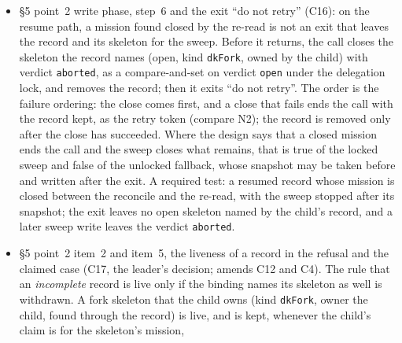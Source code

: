 \documentclass[a4paper,10pt,fleqn]{article}
\newcommand{\fpath}[1]{\texttt{#1}}
\newcommand{\field}[1]{\texttt{#1}}
\begin{document}
\begin{itemize}
    closed it). The sentences ``removed as the last step of a successful
    write'' and ``the record is then overwritten or removed'' change
    accordingly; the dispatch path of \fpath{pretooluse\_dispatch.go} is not
    changed. Reconcile must distinguish the two lives of a record: a
    complete record is never resumed and is live when the child's claim is
    for the skeleton's mission, whatever the binding names; an incomplete one
    keeps the rule of C4 (withdrawn by C17: with \field{fixClaimLive} an
    incomplete record is live on the same test as a complete one, the claim
    for the skeleton's mission, and the item on C17 below replaces this
    sentence). The record needs a stage field (complete or not)
    that the YAML of today does not have, and the "record does not parse"
    row of the exit-status table applies to it for as long as the claim
    lasts.
  \item \S5 point~2 write phase, step~6 and the exit ``do not retry'' (C16):
    on the resume path, a mission found closed by the re-read is not an exit
    that leaves the record and its skeleton for the sweep. Before it returns,
    the call closes the skeleton the record names (open, kind
    \field{dkFork}, owned by the child) with verdict \field{aborted}, as a
    compare-and-set on verdict \field{open} under the delegation lock, and
    removes the record; then it exits ``do not retry''. The order is the
    failure ordering: the close comes first, and a close that fails ends the
    call with the record kept, as the retry token (compare N2); the record is
    removed only after the close has succeeded. Where the design says
    that a closed mission ends the call and the sweep closes what remains, that
    is true of the locked sweep and false of the unlocked fallback, whose
    snapshot may be taken before and written after the exit. A required test: a
    resumed record whose mission is closed between the reconcile and the
    re-read, with the sweep stopped after its snapshot; the exit leaves no open
    skeleton named by the child's record, and a later sweep write leaves the
    verdict \field{aborted}.
  \item \S5 point~2 item~2 and item~5, the liveness of a record in the refusal
    and the claimed case (C17, the leader's decision; amends C12 and C4). The
    rule that an \emph{incomplete} record is live only if the binding names
    its skeleton as well is withdrawn. A fork skeleton that the child owns
    (kind \field{dkFork}, owner the child, found through the record) is live,
    and is kept, whenever the child's claim is for the skeleton's mission,

\end{itemize}
\end{document}

